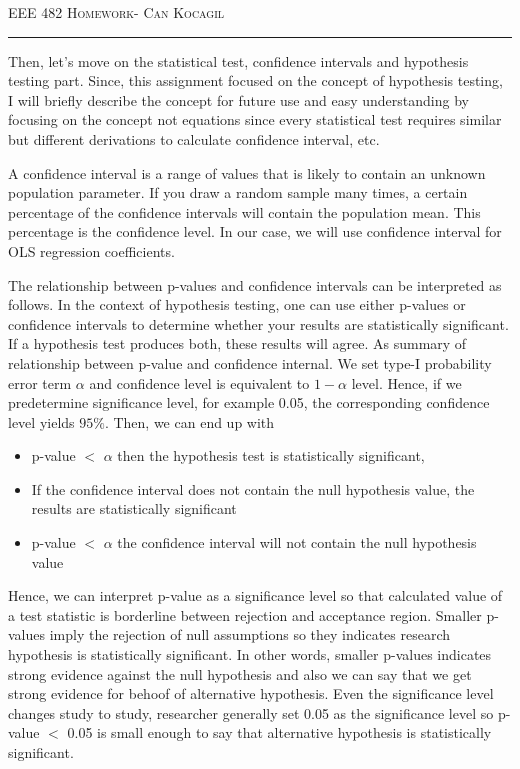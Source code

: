 \documentclass[12pt]{amsart}
\begin{document}
\newpage
{\scshape EEE 482} \hfill {\scshape \large  Homework-\relax} \hfill {\scshape Can Kocagil}
\smallskip
\hrule
\vspace{2mm}

Then, let's move on the statistical test, confidence intervals and hypothesis testing part. Since, this assignment focused on the concept of  hypothesis testing, I will briefly describe the concept for future use and easy understanding by focusing on the concept not equations since every statistical test requires similar but different derivations to calculate confidence interval, etc.

\bigskip

A confidence interval is a range of values that is likely to contain an unknown population parameter. If you draw a random sample many times, a certain percentage of the confidence intervals will contain the population mean. This percentage is the confidence level. In our case, we will use confidence interval for OLS regression coefficients.


\bigskip
The relationship between p-values and confidence intervals can be interpreted as follows. In the context of hypothesis testing, one can use either p-values or confidence intervals to determine whether your results are statistically significant. If a hypothesis test produces both, these results will agree. As summary of relationship between p-value and confidence internal. We set type-I probability error term $\alpha$ and confidence level is equivalent to $1-\alpha$ level. Hence, if we predetermine significance level, for example 0.05, the corresponding confidence level yields $95\%$. Then, we can end up with
\smallskip

\begin{itemize}
    \item p-value $<$ $\alpha$ then the hypothesis test is statistically significant,
    \item If the confidence interval does not contain the null hypothesis value, the results are statistically significant
    \item  p-value $<$ $\alpha$ the confidence interval will not contain the null hypothesis value
\end{itemize}

\bigskip
Hence, we can interpret p-value as a significance level so that calculated value of a test statistic is borderline between rejection and acceptance region. Smaller p-values imply the rejection of null assumptions so they indicates research hypothesis is statistically significant. In other words, smaller p-values indicates strong evidence against the null hypothesis and also we can say that we get strong evidence for behoof of alternative hypothesis. Even the significance level changes study to study, researcher generally set 0.05 as the significance level so p-value $<$ 0.05 is small enough to say that alternative hypothesis is statistically significant.
\end{document}
